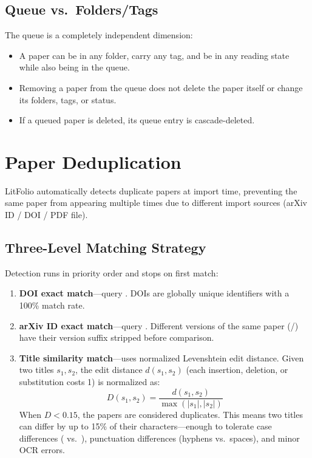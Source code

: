 \subsection{Queue vs.\ Folders/Tags}

The queue is a completely independent dimension:

\begin{itemize}
  \item A paper can be in any folder, carry any tag, and be in any reading state while
    also being in the queue.
  \item Removing a paper from the queue does not delete the paper itself or change its
    folders, tags, or status.
  \item If a queued paper is deleted, its queue entry is cascade-deleted.
\end{itemize}

\section{Paper Deduplication}

LitFolio automatically detects duplicate papers at import time, preventing the same
paper from appearing multiple times due to different import sources (arXiv ID / DOI /
PDF file).

\subsection{Three-Level Matching Strategy}

Detection runs in priority order and stops on first match:

\begin{enumerate}
  \item \textbf{DOI exact match}---query .
    DOIs are globally unique identifiers with a 100\% match rate.
  \item \textbf{arXiv ID exact match}---query . Different versions of the same paper (/) have
    their version suffix stripped before comparison.
  \item \textbf{Title similarity match}---uses normalized Levenshtein edit distance.
    Given two titles $s_1, s_2$, the edit distance $d(s_1, s_2)$ (each insertion,
    deletion, or substitution costs 1) is normalized as:
    \[
      D(s_1, s_2) = \frac{d(s_1, s_2)}{\max(|s_1|, |s_2|)}
    \]
    When $D < 0.15$, the papers are considered duplicates. This means two titles can
    differ by up to 15\% of their characters---enough to tolerate case differences
    ( vs.\ ),
    punctuation differences (hyphens vs.\ spaces), and minor OCR errors.
\end{enumerate}

